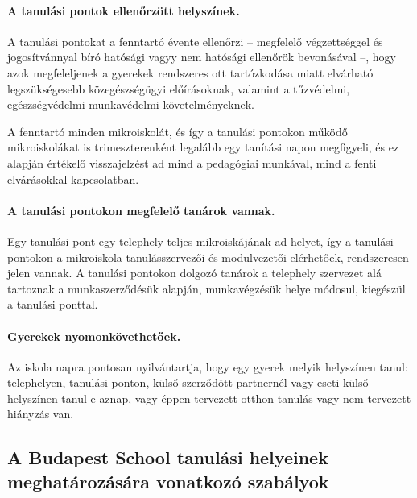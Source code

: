 \paragraph{A tanulási pontok ellenőrzött helyszínek.}

A tanulási pontokat a fenntartó évente ellenőrzi -- megfelelő végzettséggel és jogosítvánnyal bíró hatósági vagyy nem hatósági ellenőrök bevonásával --, hogy azok megfeleljenek a gyerekek rendszeres ott tartózkodása miatt elvárható legszükségesebb közegészségügyi előírásoknak, valamint a tűzvédelmi, egészségvédelmi  munkavédelmi követelményeknek.

A fenntartó minden mikroiskolát, és így a tanulási pontokon működő mikroiskolákat is trimeszterenként legalább egy tanítási napon megfigyeli, és ez alapján értékelő visszajelzést ad mind a pedagógiai munkával, mind a fenti elvárásokkal kapcsolatban.

\paragraph{A tanulási pontokon megfelelő tanárok vannak.}

Egy tanulási pont egy telephely teljes mikroiskájának ad helyet, így a tanulási pontokon a mikroiskola tanulásszervezői és modulvezetői elérhetőek, rendszeresen jelen vannak. A tanulási pontokon dolgozó tanárok a telephely szervezet alá tartoznak a munkaszerződésük alapján, munkavégzésük helye módosul, kiegészül a tanulási ponttal.

\paragraph{Gyerekek nyomonkövethetőek.}

Az iskola napra pontosan nyilvántartja, hogy egy gyerek melyik helyszínen tanul: telephelyen, tanulási ponton, külső szerződött partnernél vagy eseti külső helyszínen tanul-e aznap, vagy éppen tervezett otthon tanulás vagy nem tervezett hiányzás van.

\subsection{A Budapest School tanulási helyeinek meghatározására vonatkozó szabályok}

